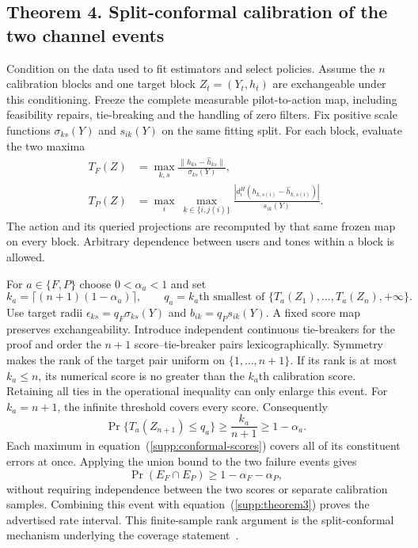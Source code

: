 \documentclass[10pt,letterpaper]{article}
\begin{document}
\subsection{Theorem 4. Split-conformal calibration of the two channel events}
Condition on the data used to fit estimators and select policies. Assume the $n$ calibration blocks and one target block $Z_t=(Y_t,h_t)$ are exchangeable under this conditioning. Freeze the complete measurable pilot-to-action map, including feasibility repairs, tie-breaking and the handling of zero filters. Fix positive scale functions $\sigma_{ks}(Y)$ and $s_{ik}(Y)$ on the same fitting split. For each block, evaluate the two maxima
\begin{equation}
 \begin{aligned}
 T_F(Z)&=\max_{k,s}\frac{\|h_{ks}-\hat h_{ks}\|}{\sigma_{ks}(Y)},\\
 T_P(Z)&=\max_i\ \max_{k\in\{i,j(i)\}}
 \frac{|d_i^H(h_{k,s(i)}-\hat h_{k,s(i)})|}{s_{ik}(Y)}.
 \end{aligned}
 \label{supp:conformal-scores}
\end{equation}
The action and its queried projections are recomputed by that same frozen map on every block. Arbitrary dependence between users and tones within a block is allowed.

For $a\in\{F,P\}$ choose $0<\alpha_a<1$ and set
\begin{equation}
 k_a=\lceil(n+1)(1-\alpha_a)\rceil,\qquad
 q_a=\text{$k_a$th smallest of }\{T_a(Z_1),\ldots,T_a(Z_n),+\infty\}.
 \label{supp:conformal-rank}
\end{equation}
Use target radii $\epsilon_{ks}=q_F\sigma_{ks}(Y)$ and $b_{ik}=q_Ps_{ik}(Y)$. A fixed score map preserves exchangeability. Introduce independent continuous tie-breakers for the proof and order the $n+1$ score--tie-breaker pairs lexicographically. Symmetry makes the rank of the target pair uniform on $\{1,\ldots,n+1\}$. If its rank is at most $k_a\le n$, its numerical score is no greater than the $k_a$th calibration score. Retaining all ties in the operational inequality can only enlarge this event. For $k_a=n+1$, the infinite threshold covers every score. Consequently
\begin{equation}
 \Pr\{T_a(Z_{n+1})\le q_a\}\ge\frac{k_a}{n+1}\ge1-\alpha_a.
 \label{supp:single-coverage}
\end{equation}
Each maximum in equation~(\ref{supp:conformal-scores}) covers all of its constituent errors at once. Applying the union bound to the two failure events gives
\begin{equation}
 \Pr(E_F\cap E_P)\ge1-\alpha_F-\alpha_P,
 \label{supp:joint-coverage}
\end{equation}
without requiring independence between the two scores or separate calibration samples. Combining this event with equation~(\ref{supp:theorem3}) proves the advertised rate interval. This finite-sample rank argument is the split-conformal mechanism underlying the coverage statement~\cite{lei,johnstone}.
\end{document}
